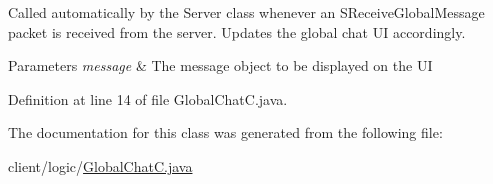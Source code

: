 Called automatically by the {\ttfamily Server} class whenever an {\ttfamily S\+Receive\+Global\+Message} packet is received from the server. Updates the global chat UI accordingly.


\begin{DoxyParams}{Parameters}
{\em message} & The message object to be displayed on the UI \\
\hline
\end{DoxyParams}


Definition at line 14 of file Global\+Chat\+C.\+java.



The documentation for this class was generated from the following file\+:\begin{DoxyCompactItemize}
\item 
client/logic/\hyperlink{_global_chat_c_8java}{Global\+Chat\+C.\+java}\end{DoxyCompactItemize}
